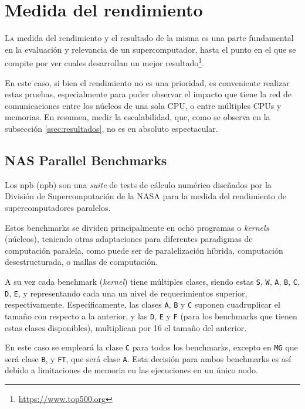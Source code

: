 \chapter{Medida del rendimiento}
\label{chap:medida_rendimiento}

\lettrine{L}{a} medida del rendimiento y el resultado de la misma es una parte fundamental en la evaluación y relevancia de un supercomputador, hasta el punto en el que se compite por ver cuales desarrollan un mejor resultado\footnote{\url{https://www.top500.org}}.

En este caso, si bien el rendimiento no es una prioridad, es conveniente realizar estas pruebas, especialmente para poder observar el impacto que tiene la red de comunicaciones entre los núcleos de una sola CPU, o entre múltiples CPUs y memorias. En resumen, medir la escalabilidad, que, como se observa en la subsección \ref{ssec:resultados}, no es en absoluto espectacular.

\section{NAS Parallel Benchmarks}
Los \acrlong{npb} (\acrshort{npb}) \cite{npb_webpage} son una \textit{suite} de tests de cálculo numérico diseñados por la División de Supercomputación de la NASA para la medida del rendimiento de supercomputadores paralelos.

Estos benchmarks se dividen principalmente en ocho programas o \textit{kernels} (núcleos), teniendo otras adaptaciones para diferentes paradigmas de computación paralela, como puede ser de paralelización híbrida, computación desestructurada, o mallas de computación.

A su vez cada benchmark (\textit{kernel}) tiene múltiples clases, siendo estas \texttt{S}, \texttt{W}, \texttt{A}, \texttt{B}, \texttt{C}, \texttt{D}, \texttt{E}, y representando cada una un nivel de requerimientos superior, respectivamente. Específicamente, las clases \texttt{A}, \texttt{B} y \texttt{C} suponen cuadruplicar el tamaño con respecto a la anterior, y las \texttt{D}, \texttt{E} y \texttt{F} (para los benchmarks que tienen estas clases disponibles), multiplican por 16 el tamaño del anterior.

En este caso se empleará la clase \texttt{C} para todos los benchmarks, excepto en \texttt{MG} que será clase \texttt{B}, y \texttt{FT}, que será clase \texttt{A}. Esta decisión para ambos benchmarks es así debido a limitaciones de memoria en las ejecuciones en un único nodo.

